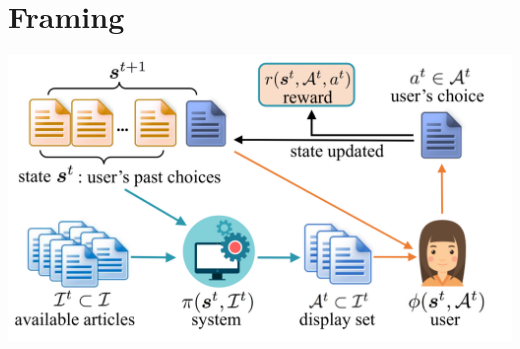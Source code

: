 \documentclass{article}
\begin{document}
    \section{Framing}
    \includegraphics{fig1.png}
    
\end{document}
